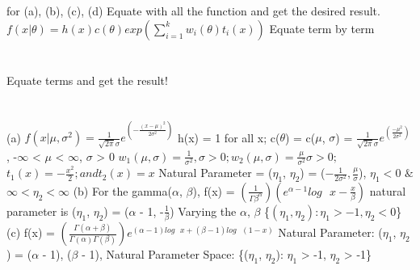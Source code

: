 \documentclass{report}
\begin{document}
\section{}
for (a), (b), (c), (d) Equate with all the function and get the desired result.
$f(x \vert \theta) = h(x)c(\theta)exp\left(\sum_{i=1}^{k} w_{i}(\theta)t_i(x)\right)$
Equate term by term
\newline 

\section{}
Equate terms and get the result!
\newline

\section{}
(a) $f(x \vert \mu, \sigma^2) = \frac{1}{\sqrt{2\pi}\sigma}e^{\left(-\frac{(x - \mu)^2}{2\sigma^2}\right)}$
\newline
h(x) = 1 for all x;
\newline
c($\theta$) = c($\mu$, $\sigma$) = $\frac{1}{\sqrt{2\pi}\sigma}e^{\left(\frac{-\mu^2}{2\sigma^2}\right)}$, -$\infty$ < $\mu$ < $\infty$, $\sigma$ > 0
\newline
$w_{1}(\mu, \sigma) = \frac{1}{\sigma^2}, \sigma > 0; w_{2}(\mu, \sigma) = \frac{\mu}{\sigma^2} \sigma > 0;$
\newline
$t_{1}(x) = -\frac{x^2}{2}; and t_2(x) = x$
\newline
{Natural Parameter = ($\eta_{1}$, $\eta_{2}$) = ($-\frac{1}{2\sigma^2}, \frac{\mu}{\sigma}$),
$\eta_{1} < 0$ $\&$ $ \infty < \eta_{2} < \infty$}
\newline
(b) For the gamma($\alpha$, $\beta$),
\newline
f(x) = $\left(\frac{1}{\Gamma\beta^{\alpha}}\right)\left(e^{\alpha - 1}log\text{ }x - \frac{x}{\beta}\right)$
\newline
natural parameter is ($\eta_{1}$, $\eta_{2}$) = ($\alpha$ - 1, -$\frac{1}{\beta}$)
\newline
Varying the $\alpha$, $\beta$
\{$(\eta_{1}, \eta_{2}): \eta_{1} > -1, \eta_{2} < 0$\}
\newline
\newline
(c) f(x) = $\left(\frac{\Gamma(\alpha + \beta)}{\Gamma(\alpha)\Gamma(\beta)}\right)e^{(\alpha - 1)log\text{ }x + (\beta - 1)log\text{ }(1-x)}$
\newline
Natural Parameter: ($\eta_{1}$, $\eta_{2}$) = {($\alpha$ - 1), ($\beta$ - 1)}, Natural Parameter Space: \{($\eta_{1}$, $\eta_{2}$): $\eta_{1}$ > -1, $\eta_{2}$ > -1\}
\end{document}
